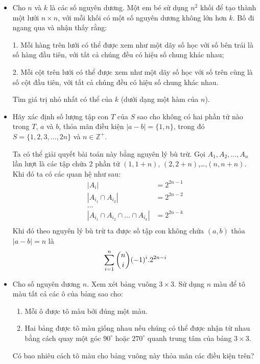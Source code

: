 \documentclass[11pt]{scrartcl}
\begin{document}
\begin{itemize}[label=, leftmargin=0em, itemsep=0.5em]
\begin{btvn}
    \end{btvn}
    \item \begin{btvn}
        Cho \( n \) và \( k \) là các số nguyên dương. Một em bé sử dụng \( n^2 \) khối để tạo thành một lưới \( n \times n \), với mỗi khối có một số nguyên dương không lớn hơn \( k \). Bố đi ngang qua và nhận thấy rằng:

        1. Mỗi hàng trên lưới có thể được xem như một dãy số học với số bên trái là số hàng đầu tiên, với tất cả chúng đều có hiệu số chung khác nhau;
        
        2. Mỗi cột trên lưới có thể được xem như một dãy số học với số trên cùng là số cột đầu tiên, với tất cả chúng đều có hiệu số chung khác nhau.

        Tìm giá trị nhỏ nhất có thể của \( k \) (dưới dạng một hàm của \( n \)).

    \end{btvn}
    \item \begin{bt}
        Hãy xác định số lượng tập con $T$ của $S$ sao cho không có hai phần tử nào trong $T$, $a$ và $b$, thỏa mãn điều kiện $|a-b|=\{1,n\}$, trong đó $S =\{1,2,3, \ldots, 2n\}$ và $n \in \mathbb{Z}^+$.
    \end{bt}
    \begin{sol}
        Ta có thể giải quyết bài toán này bằng nguyên lý bù trừ. Gọi $A_1,A_2,\dots,A_n$ lần lượt là các tập chứa 2 phần tử $(1, 1 +n)$, $(2, 2 + n)$,\dots,$(n,n + n)$. Khi đó ta có các quan hệ như sau: 
        \[
            \begin{aligned}
                |A_i| &= 2^{2n - 1}\\
                |A_{i_1} \cap A_{i_2}| &= 2^{2n - 2}\\
                \dots\\
                |A_{i_1} \cap A_{i_2} \cap \dots \cap A_{i_k}| &= 2^{2n - k}\\
            \end{aligned}
        \]
        Khi đó theo nguyên lý bù trừ ta được số tập con không chứa $(a,b)$ thỏa $|a - b| = n$ là 
        \[
            \displaystyle\sum_{i = 1}^{n}\displaystyle\binom{n}{i}(-1)^{i}.2^{2n - i}
        \]
    \end{sol}
    \item \begin{btvn}
        Cho số nguyên dương $n$. Xem xét bảng vuông $3 \times 3$. Sử dụng $n$ màu để tô màu tất cả các ô của bảng sao cho:
        \begin{enumerate}
            \item Mỗi ô được tô màu bởi đúng một màu.
            \item Hai bảng được tô màu giống nhau nếu chúng có thể được nhận từ nhau bằng cách quay một góc $90^\circ$ hoặc $270^\circ$ quanh trung tâm của bảng $3 \times 3$.
        \end{enumerate}
    Có bao nhiêu cách tô màu cho bảng vuông này thỏa mãn các điều kiện trên?
    \end{btvn}


\end{itemize}
\end{document}
